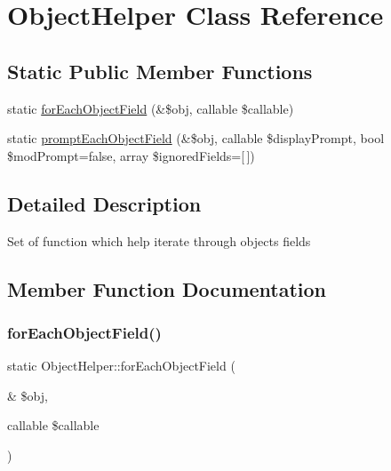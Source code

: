 \hypertarget{classObjectHelper}{}\section{Object\+Helper Class Reference}
\label{classObjectHelper}
\subsection*{Static Public Member Functions}
\begin{DoxyCompactItemize}
\item 
static \hyperlink{classObjectHelper_ac4635dabbe7d6552d0bc6c3bcb2da485}{for\+Each\+Object\+Field} (\&\$obj, callable \$callable)
\item 
static \hyperlink{classObjectHelper_aee0184a88585f2872a33f0311cfe1457}{prompt\+Each\+Object\+Field} (\&\$obj, callable \$display\+Prompt, bool \$mod\+Prompt=false, array \$ignored\+Fields=\mbox{[}$\,$\mbox{]})
\end{DoxyCompactItemize}


\subsection{Detailed Description}
Set of function which help iterate through object\textquotesingle{}s fields 

\subsection{Member Function Documentation}
\mbox{\label{classObjectHelper_ac4635dabbe7d6552d0bc6c3bcb2da485}} 
\subsubsection{\texorpdfstring{for\+Each\+Object\+Field()}{forEachObjectField()}}
{\footnotesize\ttfamily static Object\+Helper\+::for\+Each\+Object\+Field (\begin{DoxyParamCaption}\item[{\&}]{\$obj,  }\item[{callable}]{\$callable }\end{DoxyParamCaption})\hspace{0.3cm}{\ttfamily [static]}}

